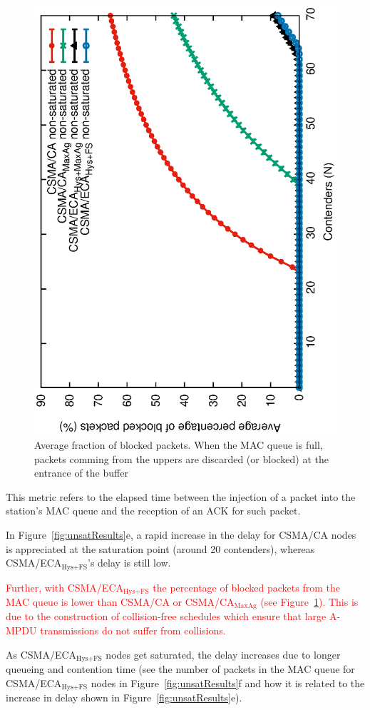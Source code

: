 	\begin{figure}[tb]
		\centering
		\includegraphics[width=0.7\linewidth,angle=-90]{figures/unsaturated/blockingProb-unsat/blocking-unsaturated-TON.eps}
		\caption{Average fraction of blocked packets. When the MAC queue is full, packets comming from the uppers are discarded (or blocked) at the entrance of the buffer}
		\label{fig:blocked-packets}
	\end{figure}	
	
	This metric refers to the elapsed time between the injection of a packet into the station's MAC queue and the reception of an ACK for such packet. 
	
	In Figure~\ref{fig:unsatResults}e, a rapid increase in the delay for CSMA/CA nodes is appreciated at the saturation point (around 20 contenders), whereas CSMA/ECA$_{\text{Hys+FS}}$'s delay is still low. 
	
	\textcolor{red}{Further, with CSMA/ECA$_{\text{Hys+FS}}$ the percentage of blocked packets from the MAC queue is lower than CSMA/CA or CSMA/CA$_{\text{MaxAg}}$ (see Figure~\ref{fig:blocked-packets}). This is due to the construction of collision-free schedules which ensure that large A-MPDU transmissions do not suffer from collisions.}
	
	As CSMA/ECA$_{\text{Hys+FS}}$ nodes get saturated, the delay increases due to longer queueing and contention time (see the number of packets in the MAC queue for CSMA/ECA$_{\text{Hys+FS}}$ nodes in Figure~\ref{fig:unsatResults}f and how it is related to the increase in delay shown in Figure~\ref{fig:unsatResults}e).
	
